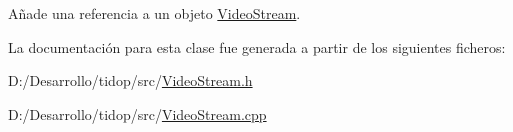 Añade una referencia a un objeto \hyperlink{class_i3_d_1_1_video_stream}{Video\+Stream}. 



La documentación para esta clase fue generada a partir de los siguientes ficheros\+:\begin{DoxyCompactItemize}
\item 
D\+:/\+Desarrollo/tidop/src/\hyperlink{_video_stream_8h}{Video\+Stream.\+h}\item 
D\+:/\+Desarrollo/tidop/src/\hyperlink{_video_stream_8cpp}{Video\+Stream.\+cpp}\end{DoxyCompactItemize}
